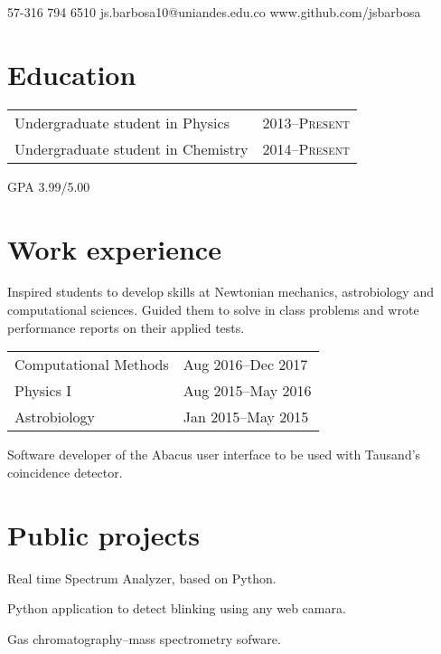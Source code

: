 \documentclass{my_cv}
\begin{document}
{57-316 794 6510}
{js.barbosa10@uniandes.edu.co}
{www.github.com/jsbarbosa}


\section{Education}
{\scshape
	\begin{tabular}{l@{\hskip 1in}l}
		Undergraduate student in Physics & \textsc{2013--Present} \\
		Undergraduate student in Chemistry & \textsc{2014--Present}
	\end{tabular}
}

\textsc{GPA 3.99/5.00}

\section{Work experience}
Inspired students to develop skills at Newtonian mechanics, astrobiology and computational sciences. Guided them to solve in class problems and wrote performance reports on their applied tests.

{\scshape
\begin{tabular}{l@{\hskip 1in}l}
	Computational Methods & Aug 2016--Dec 2017 \\
	Physics I & Aug 2015--May 2016 \\
	Astrobiology & Jan 2015--May 2015
\end{tabular}
}

Software developer of the Abacus user interface to be used with Tausand's coincidence detector.

\section{Public projects}
Real time Spectrum Analyzer, based on Python.

Python application to detect blinking using any web camara.

Gas chromatography--mass spectrometry sofware.
\end{document}
